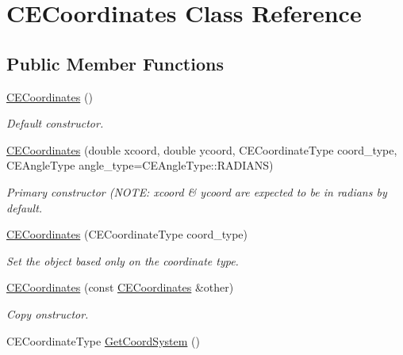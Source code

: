 \hypertarget{class_c_e_coordinates}{}\section{C\+E\+Coordinates Class Reference}
\label{class_c_e_coordinates}
\subsection*{Public Member Functions}
\begin{DoxyCompactItemize}
\item 
\hypertarget{class_c_e_coordinates_adbaa5893da76e77dca4d1b8e630132d4}{}\hyperlink{class_c_e_coordinates_adbaa5893da76e77dca4d1b8e630132d4}{C\+E\+Coordinates} ()\label{class_c_e_coordinates_adbaa5893da76e77dca4d1b8e630132d4}

\begin{DoxyCompactList}\small\item\em Default constructor. \end{DoxyCompactList}\item 
\hyperlink{class_c_e_coordinates_ad98944b414371e55e8e5d13b3475ddb0}{C\+E\+Coordinates} (double xcoord, double ycoord, C\+E\+Coordinate\+Type coord\+\_\+type, C\+E\+Angle\+Type angle\+\_\+type=C\+E\+Angle\+Type\+::\+R\+A\+D\+I\+A\+N\+S)
\begin{DoxyCompactList}\small\item\em Primary constructor (N\+O\+T\+E\+: xcoord \& ycoord are expected to be in radians by default. \end{DoxyCompactList}\item 
\hyperlink{class_c_e_coordinates_a1c51863ec6e2e6f38c9e9b42fcea323d}{C\+E\+Coordinates} (C\+E\+Coordinate\+Type coord\+\_\+type)
\begin{DoxyCompactList}\small\item\em Set the object based only on the coordinate type. \end{DoxyCompactList}\item 
\hypertarget{class_c_e_coordinates_a12be549e1747131f766bcc9c67e8fe4f}{}\hyperlink{class_c_e_coordinates_a12be549e1747131f766bcc9c67e8fe4f}{C\+E\+Coordinates} (const \hyperlink{class_c_e_coordinates}{C\+E\+Coordinates} \&other)\label{class_c_e_coordinates_a12be549e1747131f766bcc9c67e8fe4f}

\begin{DoxyCompactList}\small\item\em Copy onstructor. \end{DoxyCompactList}\item 
\hypertarget{class_c_e_coordinates_a3f86c747a99113c054fe4fc5408998ec}{}C\+E\+Coordinate\+Type \hyperlink{class_c_e_coordinates_a3f86c747a99113c054fe4fc5408998ec}{Get\+Coord\+System} ()\label{class_c_e_coordinates_a3f86c747a99113c054fe4fc5408998ec}


\end{DoxyCompactItemize}
